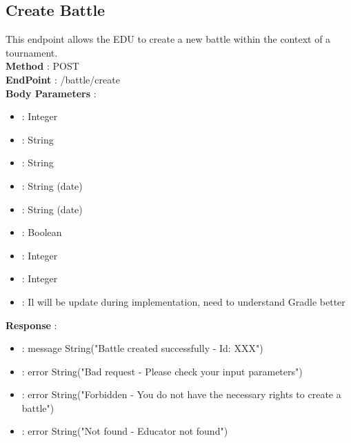 \subsection*{Create Battle}
This endpoint allows the EDU to create a new battle within the context of a tournament.\\
\textbf{Method} : POST \\
\textbf{EndPoint} : /battle/create \\
\textbf{Body Parameters} :
\begin{itemize}
    \item {} : Integer
    \item {} : String
    \item {} : String
    \item {} : String (date)
    \item {} : String (date)
    \item {} : Boolean
    \item {} : Integer
    \item {} : Integer
    \item {} : Il will be update during implementation, need to understand Gradle better
    
\end{itemize}
\textbf{Response} :
\begin{itemize}
    \item {} : message String("Battle created successfully - Id: XXX")
    \item {} : error String("Bad request - Please check your input parameters")
    \item {} : error String("Forbidden - You do not have the necessary rights to create a battle")
    \item {} : error String("Not found - Educator not found")
\end{itemize}

